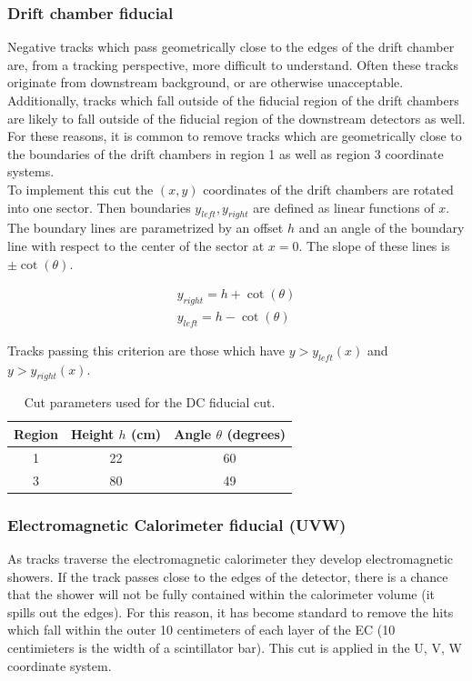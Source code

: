 \subsubsection*{Drift chamber fiducial}
Negative tracks which pass geometrically close to the edges of the drift chamber are, from a tracking perspective, more difficult to understand.  Often these tracks originate from downstream background, or are otherwise unacceptable.  Additionally, tracks which fall outside of the fiducial region of the drift chambers are likely to fall outside of the fiducial region of the downstream detectors as well.  For these reasons, it is common to remove tracks which are geometrically close to the boundaries of the drift chambers in region 1 as well as region 3 coordinate systems.\\

To implement this cut the $(x,y)$ coordinates of the drift chambers are rotated into one sector.  Then boundaries $y_{left}, y_{right}$ are defined as linear functions of $x$. The boundary lines are parametrized by an offset $h$ and an angle of the boundary line with respect to the center of the sector at $x = 0$.  The slope of these lines is $\pm \cot(\theta)$.  

\begin{eqnarray}
  y_{right} = h + \cot(\theta) \\
  y_{left} = h - \cot(\theta) 
\end{eqnarray}

Tracks passing this criterion are those which have $y > y_{left}(x)$ and $y > y_{right}(x)$.  

\begin{table}
  \centering
  \begin{tabular}{c|c|c}
    Region & Height $h$ (cm) & Angle $\theta$ (degrees)\\
    \hline 
    1 & 22 & 60 \\
    3 & 80 & 49
  \end{tabular}
  \caption{Cut parameters used for the DC fiducial cut.}
\end{table}


\subsubsection*{Electromagnetic Calorimeter fiducial (UVW)}
As tracks traverse the electromagnetic calorimeter they develop electromagnetic showers.  If the track passes close to the edges of the detector, there is a chance that the shower will not be fully contained within the calorimeter volume (it spills out the edges).  For this reason, it has become standard to remove the hits which fall within the outer 10 centimeters of each layer of the EC (10 centimieters is the width of a scintillator bar).  This cut is applied in the U, V, W coordinate system.  

